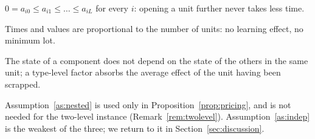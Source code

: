 \begin{assumption}\label{as:nested}
$0=a_{i0}\le a_{i1}\le\dots\le a_{iL}$ for every $i$: opening a unit further never takes less time.
\end{assumption}
\begin{assumption}[Linearity]\label{as:linear}
Times and values are proportional to the number of units: no learning effect, no minimum lot.
\end{assumption}
\begin{assumption}\label{as:indep}
The state of a component does not depend on the state of the others in the same unit; a type-level factor absorbs
the average effect of the unit having been scrapped.
\end{assumption}
Assumption~\ref{as:nested} is used only in Proposition~\ref{prop:pricing}, and is not needed for the two-level
instance (Remark~\ref{rem:twolevel}). Assumption~\ref{as:indep} is the weakest of the three; we return to it in
Section~\ref{sec:discussion}.
